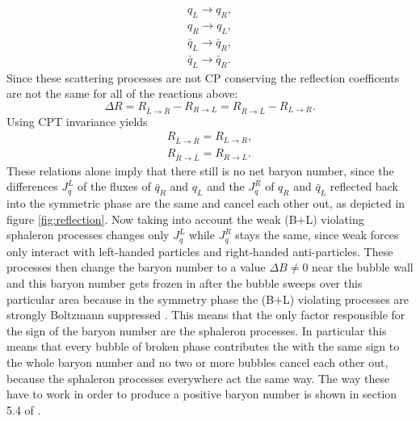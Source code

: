 \begin{align*}
	q_L\rightarrow q_R,\\
	q_R\rightarrow q_L,\\
	\bar{q}_L\rightarrow \bar{q}_R,\\
	\bar{q}_L\rightarrow \bar{q}_R.
\end{align*}
Since these scattering processes are not CP conserving the reflection coefficents are not the same for all of the reactions above:
\begin{equation}
	\Delta R=R_{\bar{L}\rightarrow\bar{R}}-R_{R\rightarrow L}=R_{\bar{R}\rightarrow\bar{L}}-R_{L\rightarrow R}.
	\label{eq:reflection_coeff}
\end{equation}
Using CPT invariance yields
\begin{align}
	R_{\bar{L}\rightarrow\bar{R}}=R_{L\rightarrow R},\\
	R_{\bar{R}\rightarrow\bar{L}}=R_{R\rightarrow L}.
\end{align}
These relations alone imply that there still is no net baryon number, since the differences $J^L_q$ of the fluxes of $\bar{q}_R$ and $q_L$ and the  $J^R_q$ of $q_R$ and $\bar{q}_L$ reflected back into the symmetric phase are the same and cancel each other out, as depicted in figure \ref{fig:reflection}. Now taking into account the weak (B+L) violating sphaleron processes changes only $J^L_q$ while  $J^R_q$ stays the same, since weak forces only interact with left-handed particles and right-handed anti-particles. These processes then change the baryon number to a value $\Delta B\neq$0 near the bubble wall and this baryon number gets frozen in after the bubble sweeps over this particular area because in the symmetry phase the (B+L) violating processes are strongly Boltzmann suppressed \cite{Bernreuther:2002uj}. This means that the only factor responsible for the sign of the baryon number are the sphaleron processes. In particular this means that every bubble of broken phase contributes the with the same sign to the whole baryon number and no two or more bubbles cancel each other out, because the sphaleron processes everywhere act the same way. The way these have to work in order to produce a positive baryon number is shown in section 5.4 of \cite{Bernreuther:2002uj}.
